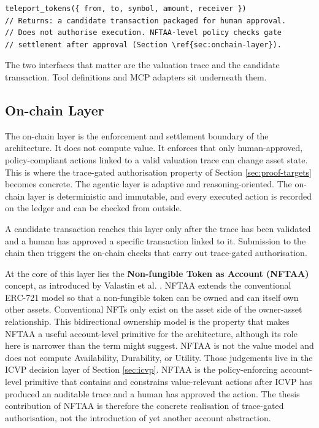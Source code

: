 \begin{lstlisting}[caption={Illustrative tool signature for cross-chain transfer.}, label={lst:tooldefinition}]
teleport_tokens({ from, to, symbol, amount, receiver })
// Returns: a candidate transaction packaged for human approval.
// Does not authorise execution. NFTAA-level policy checks gate
// settlement after approval (Section \ref{sec:onchain-layer}).
\end{lstlisting}

The two interfaces that matter are the valuation trace and the candidate transaction. Tool definitions and MCP adapters sit underneath them.

\subsection{On-chain Layer}
\label{sec:onchain-layer}

The on-chain layer is the enforcement and settlement boundary of the architecture. It does not compute value. It enforces that only human-approved, policy-compliant actions linked to a valid valuation trace can change asset state. This is where the trace-gated authorisation property of Section \ref{sec:proof-targets} becomes concrete. The agentic layer is adaptive and reasoning-oriented. The on-chain layer is deterministic and immutable, and every executed action is recorded on the ledger and can be checked from outside.

A candidate transaction reaches this layer only after the trace has been validated and a human has approved a specific transaction linked to it. Submission to the chain then triggers the on-chain checks that carry out trace-gated authorisation.

At the core of this layer lies the \textbf{Non-fungible Token as Account (NFTAA)} concept, as introduced by Valastin et al. \cite{Valastin2024nftaa}.
NFTAA extends the conventional ERC-721 model so that a non-fungible token can be owned and can itself own other assets. Conventional NFTs only exist on the asset side of the owner-asset relationship. This bidirectional ownership model is the property that makes NFTAA a useful account-level primitive for the architecture, although its role here is narrower than the term might suggest. NFTAA is not the value model and does not compute Availability, Durability, or Utility. Those judgements live in the ICVP decision layer of Section \ref{sec:icvp}. NFTAA is the policy-enforcing account-level primitive that contains and constrains value-relevant actions after ICVP has produced an auditable trace and a human has approved the action. The thesis contribution of NFTAA is therefore the concrete realisation of trace-gated authorisation, not the introduction of yet another account abstraction.

